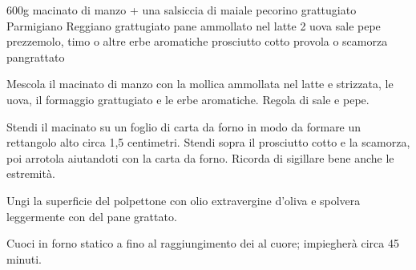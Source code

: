 \begin{ingreds}
	600g macinato di manzo + una salsiccia di maiale  
	pecorino grattugiato 
	Parmigiano Reggiano grattugiato 
	pane ammollato nel latte
	2 uova 
	sale
	pepe
	prezzemolo, timo o altre erbe aromatiche
	prosciutto cotto
	provola o scamorza 
	pangrattato 
\end{ingreds}

\begin{method}
Mescola il macinato di manzo con la mollica ammollata nel latte e strizzata, le uova, il formaggio grattugiato e le erbe aromatiche. Regola di sale e pepe.

Stendi il macinato su un foglio di carta da forno in modo da formare un rettangolo alto circa 1,5 centimetri. Stendi sopra il prosciutto cotto e la scamorza, poi arrotola aiutandoti con la carta da forno. Ricorda di sigillare bene anche le estremità.

Ungi la superficie del polpettone con olio extravergine d'oliva e spolvera leggermente con del pane grattato.

Cuoci in forno statico a  fino al raggiungimento dei  al cuore; impiegherà circa 45 minuti.
\end {method}


